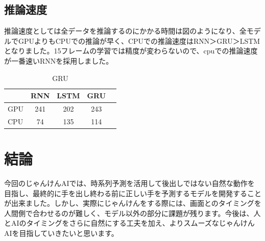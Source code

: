 \subsection{推論速度}
推論速度としては全データを推論するのにかかる時間は図のようになり、全モデルでGPUよりもCPUでの推論が早く、CPUでの推論速度はRNN＞GRU＞LSTMとなりました。15フレームの学習では精度が変わらないので、cpuでの推論速度が一番速いRNNを採用しました。
\begin{table}[h]
           \centering
           \begin{tabular}{l||c|c|c|r}
              &RNN&LSTM&GRU\\ \hline\hline
              GPU & 241 & 202 & 243\\ \hline
              CPU & 74 & 135 & 114 \\ \hline
           \end{tabular}
           \caption{GRU}
\end{table}

\section{結論}
今回のじゃんけんAIでは、時系列予測を活用して後出しではない自然な動作を目指し、最終的に手を出し終わる前に正しい手を予測するモデルを開発することが出来ました。しかし、実際にじゃんけんをする際には、画面とのタイミングを人間側で合わせるのが難しく、モデル以外の部分に課題が残ります。今後は、人とAIのタイミングをさらに自然にする工夫を加え、よりスムーズなじゃんけんAIを目指していきたいと思います。
